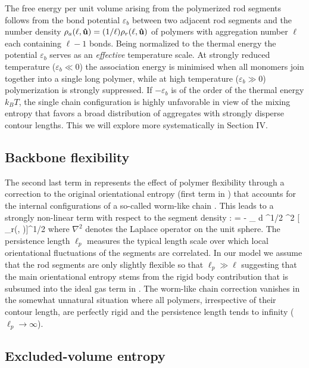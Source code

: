  The free energy per unit volume arising from the polymerized rod segments follows  from the bond potential $\varepsilon_{b}$ between two adjacent rod segments and the number density  $\rho_{a}(\ell, {\bf \hat{u}}) = (1/\ell) \rho_{r}(\ell, {\bf \hat{u}})$ of polymers with aggregation number $\ell  $  each containing  $\ell -1$ bonds. Being normalized to the thermal energy the potential $\varepsilon_{b}$ serves as an {\em effective} temperature scale. At strongly reduced temperature ($\varepsilon_{b} \ll 0$) the association energy is minimised when all monomers  join together into a single long  polymer, while at high temperature ($\varepsilon_{b} \gg 0$) polymerization is strongly suppressed. If $-\varepsilon_{b}$ is of the order of the thermal energy $k_{B}T$, the single chain configuration is highly unfavorable in view of the mixing entropy that favors a broad distribution of aggregates with strongly disperse contour lengths. This we will explore more systematically in Section IV.  

\subsection{Backbone flexibility}

The second last term in  represents the effect of polymer flexibility through a correction to the  original orientational entropy (first term in ) that accounts for the internal configurations of a so-called worm-like chain \cite{Vroege92}. This leads to a  strongly non-linear term with respect to the segment density \cite{khokhlov82,kuriabova2010}: 
\beq
   = -  \sum_{\ell} \int d ^{1/2} \nabla^{2}  [ \rho_{r}(\ell, \oma)]^{1/2}
  \label{wlc}
\eeq
where $\nabla^{2} $ denotes the Laplace operator on the unit sphere. 
The persistence length $\ell_{p}$ measures the  typical length scale over which local orientational fluctuations of the segments are correlated.  In our model we assume that the rod segments are only slightly flexible \cite{khokhlov82}  so that $\ell_{p} \gg \ell$ suggesting that the main orientational entropy stems from the rigid body contribution that is subsumed into the ideal gas term in . The worm-like chain correction   
vanishes in the somewhat unnatural situation where all polymers, irrespective of their contour length, are perfectly rigid and the persistence length tends to infinity ($\ell_p \rightarrow \infty$).  


\subsection{Excluded-volume entropy}

